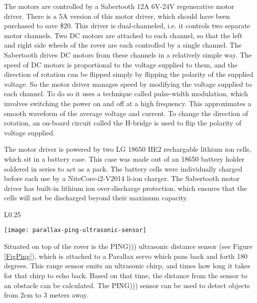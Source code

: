 The motors are controlled by a Sabertooth 12A 6V-24V regenerative motor driver. There is a 5A version of this motor driver, which should have been purchased to save \$20. This driver is dual-channeled, i.e. it controls two separate motor channels. Two DC motors are attached to each channel, so that the left and right side wheels of the rover are each controlled by a single channel. The Sabertooth drives DC motors from these channels in a relatively simple way. The speed of DC motors is proportional to the voltage supplied to them, and the direction of rotation can be flipped simply by flipping the polarity of the supplied voltage. So the motor driver manages speed by modifying the voltage supplied to each channel. To do so it uses a technique called pulse-width modulation, which involves switching the power on and off at a high frequency. This approximates a smooth waveform of the average voltage and current. To change the direction of rotation, an on-board circuit called the H-bridge is used to flip the polarity of voltage supplied. \cite{dcMotorBlog}


The motor driver is powered by two LG 18650 HE2 rechargable lithium ion cells, which sit in a battery case. This case was made out of an 18650 battery holder soldered in series to act as a pack. The battery cells were individually charged before each use by a NiteCore-i2-V2014 li-ion charger. The Sabertooth motor driver has built-in lithium ion over-discharge protection, which ensures that the cells will not be discharged beyond their maximum capacity.

\begin{wrapfigure}{L}{0.25\textwidth} %
	\caption{\cite{fig_ping}}
	\centering
	\texttt{[image: parallax-ping-ultrasonic-sensor]}
	\label{FigPing}
\end{wrapfigure}

Situated on top of the rover is the PING))) ultrasonic distance sensor (see Figure \ref{FigPing}), which is attached to a Parallax servo which pans back and forth 180 degrees. This range sensor emits an ultrasonic chirp, and times how long it takes for that chirp to echo back. Based on that time, the distance from the sensor to an obstacle can be calculated. The PING))) sensor can be used to detect objects from 2cm to 3 meters away. \cite{pingDocumentation}

